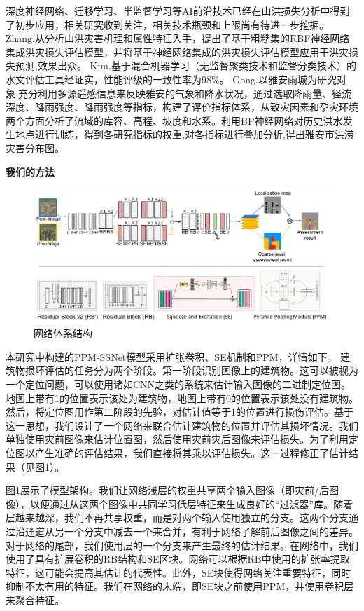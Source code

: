 \documentclass{ctexart}
\begin{document}
深度神经网络、迁移学习、半监督学习等AI前沿技术已经在山洪损失分析中得到了初步应用，相关研究收到关注，相关技术瓶颈和上限尚有待进一步挖掘。
Zhang.\cite{zhang2021loss}从分析山洪灾害机理和属性特征入手，提出了基于粗糙集的RBF神经网络集成洪灾损失评估模型，并将基于神经网络集成的洪灾损失评估模型应用于洪灾损失预测,效果出众。
Kim.\cite{kim2019hybrid}基于混合机器学习（无监督聚类技术和监督分类技术）的水文评估工具经证实，性能评级的一致性率为98\%。
Gong.\cite{gong2020hazard}以雅安雨城为研究对象,充分利用多源遥感信息来反映雅安的气象和降水状况，通过选取降雨量、径流深度、降雨强度、降雨强度等指标，构建了评价指标体系，从致灾因素和孕灾环境两个方面分析了流域的库容、高程、坡度和水系。利用BP神经网络对历史洪水发生地点进行训练，得到各研究指标的权重,对各指标进行叠加分析,得出雅安市洪涝灾害分布图。

\textbf{我们的方法}



\begin{figure}[bt]
    \centering
    \label{fig:our_net}
    \includegraphics[width=\textwidth]{our_net.pdf}
    \caption{网络体系结构}
\end{figure}

本研究中构建的PPM-SSNet模型\cite{bai2020pyramid}采用扩张卷积、SE机制和PPM，详情如下。
建筑物损坏评估的任务分为两个阶段。第一阶段识别图像上的建筑物。这可以被视为一个定位问题，可以使用诸如CNN之类的系统来估计输入图像的二进制定位图。地图上带有1的位置表示该处为建筑物，地图上带有0的位置表示该处没有建筑物。然后，将定位图用作第二阶段的先验，对估计值等于1的位置进行损伤评估。基于这一思想，我们设计了一个网络来联合估计建筑物的位置并评估其损坏情况。我们单独使用灾前图像来估计位置图，然后使用灾前灾后图像来评估损失。为了利用定位图以产生准确的评估结果，我们直接将其乘以评估损失。这一过程修正了估计结果（见图1）。

图1展示了模型架构。我们让网络浅层的权重共享两个输入图像（即灾前/后图像），以便通过从这两个图像中共同学习低层特征来生成良好的“过滤器”库。随着层越来越深，我们不再共享权重，而是对两个输入使用独立的分支。这两个分支通过沿通道从另一个分支中减去一个来合并，有利于网络了解前后图像之间的差异。对于网络的尾部，我们使用层的一个分支来产生最终的估计结果。在网络中，我们使用了具有扩展卷积的RB结构和SE区块。网络可以根据RB中使用的扩张率提取特征，这可能会提高其估计的代表性。此外，SE块使得网络关注重要特征，同时抑制不太有用的特征。我们在网络的末端，即SE块之前使用PPM，并使用卷积层来聚合特征。
\end{document}
